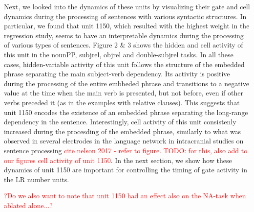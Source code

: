Next, we looked into the dynamics of these units by visualizing their gate and cell dynamics during the processing of sentences with various syntactic structures. In particular, we found that unit 1150, which resulted with the highest weight in the regression study, seems to have an interpretable dynamics during the processing of various types of sentences. Figure 2 \& 3 shows the hidden and cell activity of this unit in the nounPP, subjrel, objrel and double-subjrel tasks. In all these cases, hidden-variable activity of this unit follows the structure of the embedded phrase separating the main subject-verb dependency. Its activity is positive during the processing of the entire embbeded phrase and transitions to a negative value at the time when the main verb is presented, but not before, even if other verbs preceded it (as in the examples with relative clauses). This suggests that unit 1150 encodes the existence of an embedded phrase separating the long-range dependency in the sentence. Interestingly, cell activity of this unit consistenly increased during the procesding of the embedded phrase, similarly to what was observed in several electrodes in the language network in intracranial studies on sentence processing \textcolor{red}{cite nelson 2017 - refer to figure. TODO: for this, also add to our figures cell activity of unit 1150}. In the next section, we show how these dynamics of unit 1150 are important for controlling the timing of gate activity in the LR number units.



\textcolor{red}{?Do we also want to note that unit 1150 had an effect also on the NA-task when ablated alone...?}



